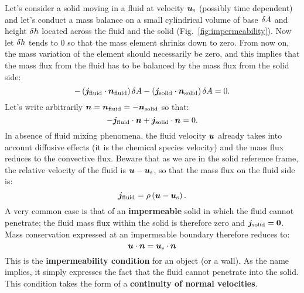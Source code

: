 Let's consider a solid moving in a fluid at velocity $\bu_\text s$ (possibly time dependent) and let's conduct a mass balance on a small cylindrical volume of base $\delta A$ and height $\delta h$ located across the fluid and the solid (Fig.~\ref{fig:impermeability}). Now let $\delta h$ tends to 0 so that the mass element shrinks down to zero.  From now on, the mass variation of the element should necessarily be zero, and this implies that the mass flux from the fluid has to be balanced by the mass flux from the solid side:
\begin{equation}
-\lp\bj_\text{fluid}\cdot \bn_\text{fluid}\rp \delA -  \lp\bj_\text{solid}\cdot \bn_\text{solid}\rp \delA = 0.
\end{equation}
Let's write arbitrarily $\bn = \bn_\text{fluid} = - \bn_\text{solid}$ so that:
\begin{equation}
-\bj_\text{fluid}\cdot \bn +  \bj_\text{solid}\cdot \bn = 0.
\end{equation}
In absence of fluid mixing phenomena, the fluid velocity $\bu$ already takes into account diffusive effects (it is the chemical species velocity) and the mass flux reduces to the convective flux. Beware that as we are in the solid reference frame, the relative velocity of the fluid is $\bu - \bu_\text s$, so that the mass flux on the fluid side is:
\begin{equation}
\bj_\text{fluid} = \rho \lp\bu-\bu_\text s\rp.
\end{equation}
 A very common case is that of an \textbf{impermeable} solid in which the fluid cannot penetrate; the fluid mass flux within the solid is therefore zero and $\bj_\text{solid} = \boldsymbol 0$. Mass conservation expressed at an impermeable boundary therefore reduces to:
\begin{equation}
\bu\cdot\bn = \bu_\text s \cdot\bn
\label{eq:impermeability}
\end{equation}
This is the \textbf{impermeability condition} for an object (or a wall). As the name implies, it simply expresses the fact that the fluid cannot penetrate into the solid. This condition takes the form of a \textbf{continuity of normal velocities}.

